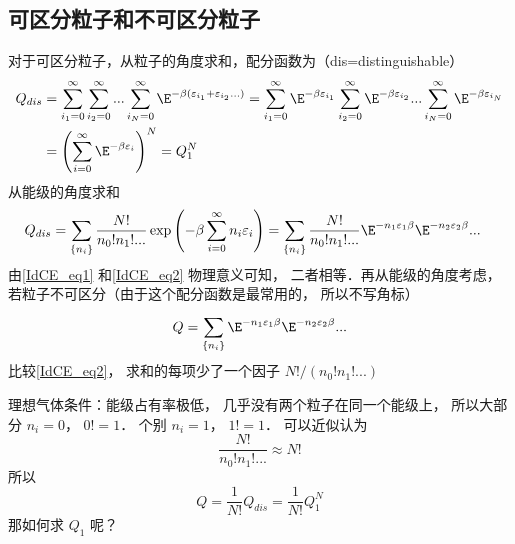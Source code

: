 
\subsection{可区分粒子和不可区分粒子}
对于可区分粒子，从粒子的角度求和，配分函数为（dis=distinguishable）
\begin{equation}\label{IdCE_eq1}
\begin{aligned}
{Q_{dis}} & = \sum\limits_{{i_1} = 0}^\infty  {\sum\limits_{{i_2} = 0}^\infty  {...\sum\limits_{{i_N} = 0}^\infty  {\E^{ - \beta ({\varepsilon_{i_1}} + {\varepsilon_{i_2}}...)}} } } = \sum\limits_{{i_1} = 0}^\infty  {\E^{ - \beta {\varepsilon_{i_1}}}} \sum\limits_{{i_2} = 0}^\infty  {\E^{ - \beta {\varepsilon_{i_2}}}} ...\sum\limits_{{i_N} = 0}^\infty  {\E^{ - \beta {\varepsilon_{i_N}}}} \\
& = {\left( {\sum\limits_{i = 0}^\infty  {\E^{ - \beta {\varepsilon_i}}} } \right)^N}= Q_1^N
\end{aligned}
\end{equation}
从能级的角度求和
\begin{equation}\label{IdCE_eq2}
\begin{aligned}
{Q_{dis}} & = \sum\limits_{\{ {n_i}\} }^{} {\frac{N!}{{n_0}!{n_1}!...}\exp \left( { - \beta \sum\limits_{i = 0}^\infty  {{n_i}{\varepsilon_i}} } \right)} = \sum\limits_{\{ {n_i}\} }^{} {\frac{N!}{{n_0}!{n_1}!...}{\E^{ - {n_1}{\varepsilon_1}\beta }}{\E^{ - {n_2}{\varepsilon_2}\beta }}...}
\end{aligned}
\end{equation}
由\autoref{IdCE_eq1} 和\autoref{IdCE_eq2} 物理意义可知， 二者相等．再从能级的角度考虑， 若粒子不可区分（由于这个配分函数是最常用的， 所以不写角标）
\begin{equation}\label{IdCE_eq3}
Q = \sum\limits_{\{ {n_i}\} }^{} {{\E^{ - {n_1}{\varepsilon_1}\beta }}{\E^{ - {n_2}{\varepsilon_2}\beta }}...}
\end{equation}
比较\autoref{IdCE_eq2}，  求和的每项少了一个因子 ${N!}/({{n_0}!{n_1}!...})$

理想气体条件：能级占有率极低， 几乎没有两个粒子在同一个能级上， 所以大部分 ${n_i} = 0$，  $0! = 1$．  个别 ${n_i} = 1$，  $1! = 1$．
可以近似认为
\begin{equation}
\frac{N!}{{n_0}!{n_1}!...} \approx N!
\end{equation}
所以
\begin{equation}
Q = \frac{1}{N!}{Q_{dis}} = \frac{1}{N!}Q_1^N
\end{equation}
那如何求 $Q_1$ 呢？ 

